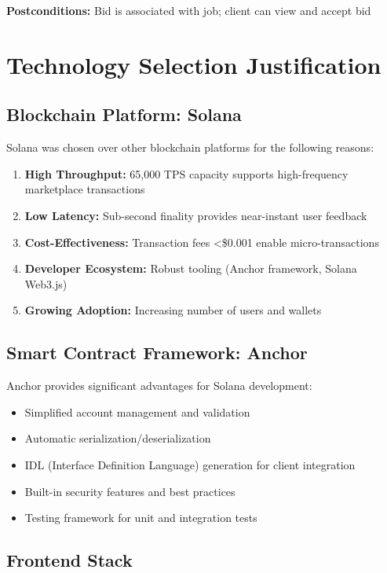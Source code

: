 \documentclass[a4paper,13pt,twoside]{report}
\theoremstyle{definition}
\begin{document}
\textbf{Postconditions:} Bid is associated with job; client can view and accept bid

\section{Technology Selection Justification}

\subsection{Blockchain Platform: Solana}

Solana was chosen over other blockchain platforms for the following reasons:

\begin{enumerate}
    \item \textbf{High Throughput:} 65,000 TPS capacity supports high-frequency marketplace transactions
    \item \textbf{Low Latency:} Sub-second finality provides near-instant user feedback
    \item \textbf{Cost-Effectiveness:} Transaction fees <\$0.001 enable micro-transactions
    \item \textbf{Developer Ecosystem:} Robust tooling (Anchor framework, Solana Web3.js)
    \item \textbf{Growing Adoption:} Increasing number of users and wallets
\end{enumerate}

\subsection{Smart Contract Framework: Anchor}

Anchor provides significant advantages for Solana development:

\begin{itemize}
    \item Simplified account management and validation
    \item Automatic serialization/deserialization
    \item IDL (Interface Definition Language) generation for client integration
    \item Built-in security features and best practices
    \item Testing framework for unit and integration tests
\end{itemize}

\subsection{Frontend Stack}
\end{document}
